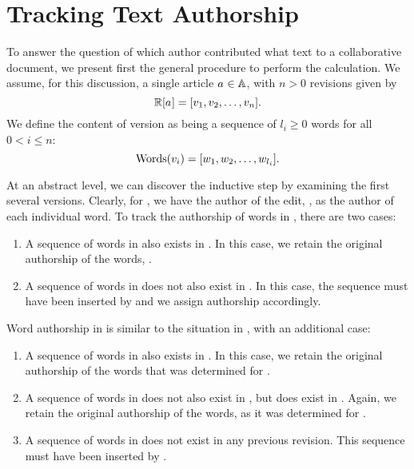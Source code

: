 \section{Tracking Text Authorship}
\label{sec:diff-tracking}

To answer the question of which author contributed what text to a
collaborative document, we present first the general procedure to
perform the calculation.
We assume, for this discussion, a single article $a_{} \in \mathbb{A}$,
with $n > 0$ revisions given by
\begin{equation*}
\revisions{\article{}} = [ \version{1}, \version{2}, \ldots, \version{n} ].
\end{equation*}
We define the content of version 
as being a sequence of $l_i \ge 0$ words for all $0 < i \le n$:
\begin{equation*}
\mathrm{Words}(v_{i}) = [ w_1, w_2, \ldots, w_{l_i} ].
\end{equation*}


At an abstract level, we can discover the inductive step by examining
the first several versions.
Clearly, for , we have the author of the edit,
, as the author of each individual word.
To track the authorship of words in , there are two cases:
\begin{enumerate}
\item A sequence of words in  also exists in .
	In this case, we retain the original authorship of the words,
	.
\item A sequence of words in  does not also exist in .
	In this case, the sequence must have been inserted by
	 and we assign authorship accordingly.
\end{enumerate}
Word authorship in  is similar to the situation in
, with an additional case:
\begin{enumerate}
\item A sequence of words in  also exists in .
	In this case, we retain the original authorship of the words
	that was determined for .
\item A sequence of words in  does not also exist in ,
	but does exist in .
	Again, we retain the original authorship of the words, as it was
	determined for .
\item A sequence of words in  does not exist in any previous
	revision.
	This sequence must have been inserted by .
\end{enumerate}

